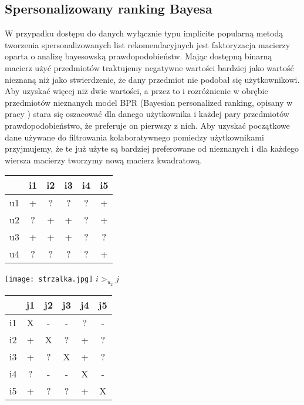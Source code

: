 \documentclass{pracamgr}
\begin{document}
   \subsection{Spersonalizowany ranking Bayesa}
    W przypadku dostępu do danych wyłącznie typu implicite popularną metodą tworzenia spersonalizowanych list rekomendacyjnych jest
    faktoryzacja macierzy oparta o analizę bayesowską prawdopodobieństw.\newline
    Mając dostępną binarną macierz użyć przedmiotów traktujemy negatywne wartości bardziej jako wartość nieznaną niż jako stwierdzenie,
    że dany przedmiot nie podobał się użytkownikowi. Aby uzyskać więcej niż dwie wartości, a przez to i rozróżnienie w obrębie przedmiotów nieznanych
    model BPR (Bayesian personalized ranking, opisany w pracy \cite{BPR}) stara się oszacować dla danego użytkownika i każdej pary przedmiotów prawdopodobieństwo,
    że preferuje on pierwszy z nich. Aby uzyskać początkowe dane używane do filtrowania kolaboratywnego pomiedzy użytkownikami
    przyjmujemy, że te już użyte są bardziej preferowane od nieznanych i dla każdego wiersza macierzy tworzymy nową macierz kwadratową.
     \begin{multicols}{3}
     \begin{tabular}{c|c|c|c|c|c|}
       & i1 & i2 & i3 & i4 & i5 \\
      \hline
      u1 & + & ? & ? & ? & + \\
      \hline
      u2 & ? & + & + & ? & + \\    
      \hline
      u3 & + & + & + & ? & ? \\
      \hline
      u4 & ? & ? & ? & ? & + \\    
     \end{tabular}
     \begin{center}
      \texttt{[image: strzalka.jpg]}\newline
      $i>_{u_2}j$
     \end{center}
     \begin{tabular}{c|c|c|c|c|c|}
       & j1 & j2 & j3 & j4 & j5 \\
      \hline
      i1 & X & - & - & ? & - \\
      \hline
      i2 & + & X & ? & + & ? \\    
      \hline
      i3 & + & ? & X & + & ? \\    
      \hline
      i4 & ? & - & - & X & - \\
      \hline
      i5 & + & ? & ? & + & X \\ 
     \end{tabular}
    \end{multicols}
\end{document}

